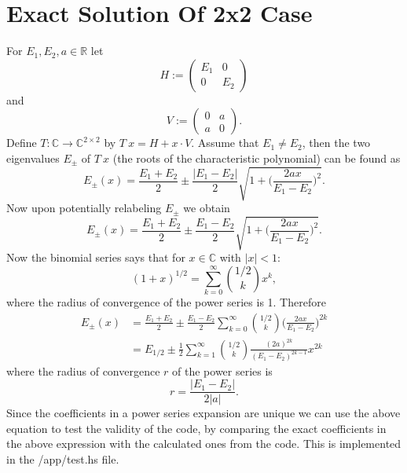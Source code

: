 \documentclass[11pt]{article}
\begin{document}
\section{Exact Solution Of 2x2 Case}
For $E_1, E_2, a \in \mathbb{R}$
let
$$H:=
\begin{pmatrix}
E_1 & 0 \\
0 & E_2
\end{pmatrix}$$
and
$$
V :=
\begin{pmatrix}
0 & a \\
a & 0
\end{pmatrix}.
$$
Define $T: \mathbb{C} \to \mathbb{C}^{2 \times 2}$
by $T \ x =  H + x \cdot V$.
Assume that $E_1 \neq E_2$, then
the two eigenvalues $E_\pm$ of $T \  x$ (the roots of the characteristic polynomial) can be found as
\begin{equation}
   E_\pm (x) =  \frac{E_{1}+ E_2}{2}
   \pm \frac{|E_1 -E_2|}{2} \sqrt{
    1 + \bigg(\frac{2 a x}{E_1-E_2}\bigg)^2
   }.
\end{equation}
Now upon potentially relabeling $E_\pm$ we obtain
\begin{equation}
    E_\pm (x) =  \frac{E_{1}+ E_2}{2}
    \pm \frac{E_1 -E_2}{2} \sqrt{
     1 + \bigg(\frac{2 a x}{E_1-E_2}\bigg)^2
    }.
 \end{equation}
Now the binomial series says that for $x \in \mathbb{C}$ with $|x|<1$:
\begin{equation}
    (1+x)^{1/2} = \sum_{k=0}^\infty
    {1/2 \choose k} x^k,
\end{equation}
where the radius of convergence of the power series is 1.
Therefore
\begin{equation}
    \begin{split}
        E_\pm (x) &=  \frac{E_{1}+ E_2}{2}
   \pm \frac{E_1 -E_2}{2} \sum_{k=0}^\infty
   {1/2 \choose k} \bigg(\frac{2 a x}{E_1-E_2}\bigg)^{2k} \\
   &= E_{1/2} \pm \frac{1}{2} \sum_{k=1}^\infty
   {1/2 \choose k} \frac{(2 a)^{2k}}{(E_1-E_2)^{2k-1}} x^{2k}
    \end{split}
\end{equation}
where the radius of convergence $r$ of the power series is
\begin{equation}
    r = \frac{|E_1 -E_2|}{2 |a|} .
\end{equation}
Since the coefficients in a power series expansion are unique
we can use the above equation to test the validity of the code,
by comparing the exact coefficients in the above expression with the calculated ones
from the code.
This is implemented in the /app/test.hs file.
\end{document}

